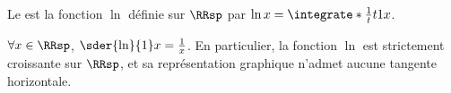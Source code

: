\begin{defi}
	Le  est la fonction $\ln$ définie sur $\RRsp$ par $\ln x = \integrate*{\frac1t}{t}{1}{x}$.
\end{defi}




\begin{fact}
	$\forall x \in \RRsp$,
	$\sder{\ln}{1} x = \frac1x$.
	En particulier,
	la fonction $\ln$ est strictement croissante sur $\RRsp$,
	et
	sa représentation graphique n'admet aucune tangente horizontale.
\end{fact}